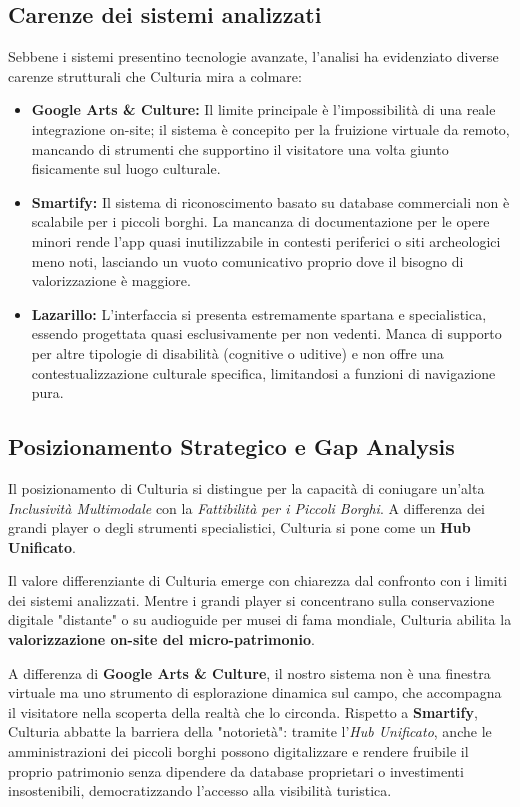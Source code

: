 \subsection{Carenze dei sistemi analizzati}
Sebbene i sistemi presentino tecnologie avanzate, l'analisi ha evidenziato diverse carenze strutturali che Culturia mira a colmare:
\begin{itemize}
    \item \textbf{Google Arts \& Culture:} Il limite principale è l'impossibilità di una reale integrazione on-site; il sistema è concepito per la fruizione virtuale da remoto, mancando di strumenti che supportino il visitatore una volta giunto fisicamente sul luogo culturale.
    \item \textbf{Smartify:} Il sistema di riconoscimento basato su database commerciali non è scalabile per i piccoli borghi. La mancanza di documentazione per le opere minori rende l'app quasi inutilizzabile in contesti periferici o siti archeologici meno noti, lasciando un vuoto comunicativo proprio dove il bisogno di valorizzazione è maggiore.
    \item \textbf{Lazarillo:} L'interfaccia si presenta estremamente spartana e specialistica, essendo progettata quasi esclusivamente per non vedenti. Manca di supporto per altre tipologie di disabilità (cognitive o uditive) e non offre una contestualizzazione culturale specifica, limitandosi a funzioni di navigazione pura.
\end{itemize}

\subsection{Posizionamento Strategico e Gap Analysis}
Il posizionamento di Culturia si distingue per la capacità di coniugare un'alta \textit{Inclusività Multimodale} con la \textit{Fattibilità per i Piccoli Borghi}. A differenza dei grandi player o degli strumenti specialistici, Culturia si pone come un \textbf{Hub Unificato}.

Il valore differenziante di Culturia emerge con chiarezza dal confronto con i limiti dei sistemi analizzati. Mentre i grandi player si concentrano sulla conservazione digitale "distante" o su audioguide per musei di fama mondiale, Culturia abilita la \textbf{valorizzazione on-site del micro-patrimonio}.

A differenza di \textbf{Google Arts \& Culture}, il nostro sistema non è una finestra virtuale ma uno strumento di esplorazione dinamica sul campo, che accompagna il visitatore nella scoperta della realtà che lo circonda. Rispetto a \textbf{Smartify}, Culturia abbatte la barriera della "notorietà": tramite l'\textit{Hub Unificato}, anche le amministrazioni dei piccoli borghi possono digitalizzare e rendere fruibile il proprio patrimonio senza dipendere da database proprietari o investimenti insostenibili, democratizzando l'accesso alla visibilità turistica.

